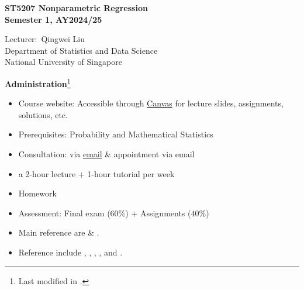 \documentclass[19pt,landscaoe]{article}
\begin{document}
%

\begin{titlepage}
\begin{center}
    \vfill
\textbf{\huge ST5207 Nonparametric Regression\\
Semester 1, AY2024/25}\\[4cm]
\begin{minipage}{0.4\textwidth}
\begin{center} \large
Lecturer:~Qingwei Liu\\
\vskip 6pt
Department of Statistics and Data Science\\
\vskip 6pt
National University of Singapore
\end{center}
\end{minipage}%
\vfill
\vfill
\end{center}

\end{titlepage}
%
\newpage
{\LARGE\centerline{\textbf {Administration}\footnote{Last modified in .}}}
\vskip25pt
\begin{minipage}{.9\textwidth}
    \Large
\begin{itemize}
\item Course website: Accessible through \href{https://www.nus.edu.sg/canvas/login/}{Canvas} for lecture slides, assignments, solutions, etc. 
\item Prerequisites: Probability and Mathematical Statistics 
\item Consultation: via \href{mailto:liu_qw@nus.edu.sg}{ email} \& appointment via email
\item a 2-hour lecture + 1-hour tutorial per week
\item Homework
\item Assessment: Final exam ($60\%$) + Assignments ($40\%$)
\item Main reference are \cite{hardle04} \& \cite{scott15}. 
\item Reference include \cite{simonoff12}, \cite{takezawa05}, \cite{wasserman}, \cite{Hall13}, and \cite{kloke14}.

\end{itemize}
\end{minipage}
\end{document}
